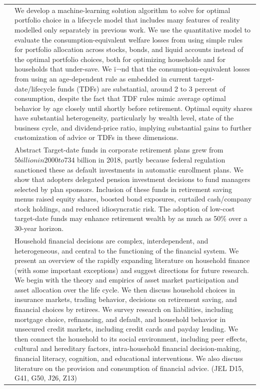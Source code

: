 \documentclass{article}
\begin{document}
\begin{tabular}{p{}p{}}
\cite{Duarte_2021} & We develop a machine-learning solution algorithm to solve for optimal portfolio choice in a lifecycle model that includes many features of reality modelled only separately in previous work. We use the quantitative model to evaluate the consumption-equivalent welfare losses from using simple rules for portfolio allocation across stocks, bonds, and liquid accounts instead of the optimal portfolio choices, both for optimizing households and for households that under-save. We ï¬nd that the consumption-equivalent losses from using an age-dependent rule as embedded in current target-date/lifecycle funds (TDFs) are substantial, around 2 to 3 percent of consumption, despite the fact that TDF rules mimic average optimal behavior by age closely until shortly before retirement. Optimal equity shares have substantial heterogeneity, particularly by wealth level, state of the business cycle, and dividend-price ratio, implying substantial gains to further customization of advice or TDFs in these dimensions. \\
\cite{Mitchell_2021} & Abstract Target-date funds in corporate retirement plans grew from $5 billion in 2000 to$734 billion in 2018, partly because federal regulation sanctioned these as default investments in automatic enrollment plans. We show that adopters delegated pension investment decisions to fund managers selected by plan sponsors. Inclusion of these funds in retirement saving menus raised equity shares, boosted bond exposures, curtailed cash/company stock holdings, and reduced idiosyncratic risk. The adoption of low-cost target-date funds may enhance retirement wealth by as much as 50\% over a 30-year horizon. \\
\cite{Gomes_2021} & Household financial decisions are complex, interdependent, and heterogeneous, and central to the functioning of the financial system. We present an overview of the rapidly expanding literature on household finance (with some important exceptions) and suggest directions for future research. We begin with the theory and empirics of asset market participation and asset allocation over the life cycle. We then discuss household choices in insurance markets, trading behavior, decisions on retirement saving, and financial choices by retirees. We survey research on liabilities, including mortgage choice, refinancing, and default, and household behavior in unsecured credit markets, including credit cards and payday lending. We then connect the household to its social environment, including peer effects, cultural and hereditary factors, intra-household financial decision-making, financial literacy, cognition, and educational interventions. We also discuss literature on the provision and consumption of financial advice. (JEL D15, G41, G50, J26, Z13) \\

\end{tabular}
\end{document}
